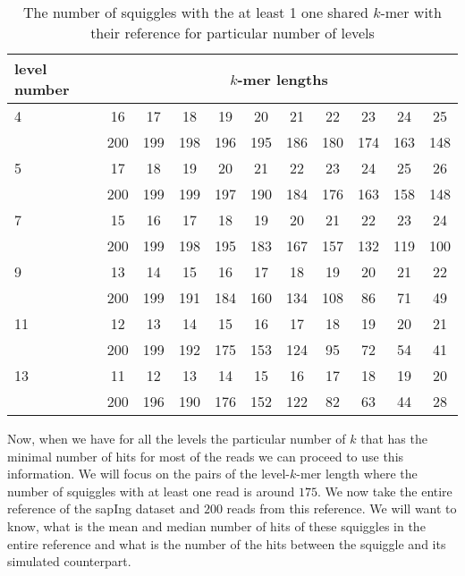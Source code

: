 \begin{table}
\caption[TODO]{The number of squiggles with the at least 1 one shared $k$-mer with their
reference for particular number of levels}
\label{tab:sharedKmers}
\begin{center}
\begin{tabular}{|l|c|c|c|c|c|c|c|c|c|c|}
\hline
level number & \multicolumn{10}{|c|}{$k$-mer lengths} \\
\hline
4 & 16 & 17 & 18 & 19 & 20 & 21 & 22 & 23 & 24 & 25 \\\cline{2-11}
& 200 & 199 & 198 & 196 & 195 & 186 & 180 & 174 & 163 & 148 \\\cline{2-11}
\hline
5 & 17 & 18 & 19 & 20 & 21 & 22 & 23 & 24 & 25 & 26 \\\cline{2-11}
& 200 & 199 & 199 & 197 & 190 & 184 & 176 & 163 & 158 & 148 \\\cline{2-11}
\hline
7 & 15 & 16 & 17 & 18 & 19 & 20 & 21 & 22 & 23 & 24 \\\cline{2-11}
& 200 & 199 & 198 & 195 & 183 & 167 & 157 & 132 & 119 & 100 \\\cline{2-11}
\hline
9 & 13 & 14 & 15 & 16 & 17 & 18 & 19 & 20 & 21 & 22 \\\cline{2-11}
& 200 & 199 & 191 & 184 & 160 & 134 & 108 & 86 & 71 & 49 \\\cline{2-11}
\hline
11 & 12 & 13 & 14 & 15 & 16 & 17 & 18 & 19 & 20 & 21 \\\cline{2-11}
& 200 & 199 & 192 & 175 & 153 & 124 & 95 & 72 & 54 & 41 \\\cline{2-11}
\hline
13 & 11 & 12 & 13 & 14 & 15 & 16 & 17 & 18 & 19 & 20 \\\cline{2-11}
& 200 & 196 & 190 & 176 & 152 & 122 & 82 & 63 & 44 & 28 \\\cline{2-11}
\hline
\end{tabular}
\end{center}
\end{table}

Now, when we have for all the levels the particular number of $k$ that
has the minimal number of hits for most of the reads we can proceed to use
this information. We will focus on the pairs of the level-$k$-mer length
where the number of squiggles with at least one read is around $175$.
We now take the entire reference of the sapIng dataset and $200$ reads from this
reference. We will want to know, what is the mean and median number of hits of
these squiggles in the entire reference and what is the number of the hits between
the squiggle and its simulated counterpart.

